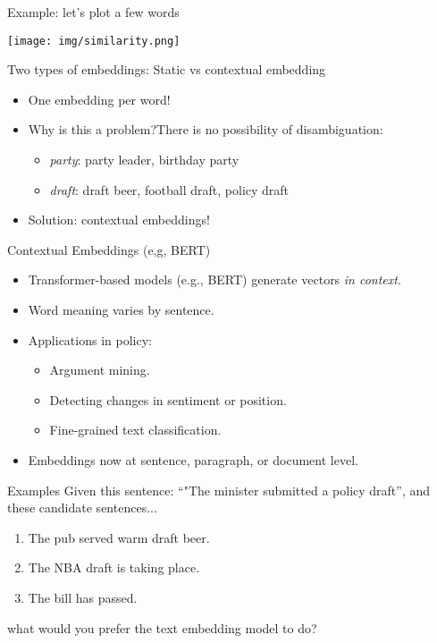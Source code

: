 \documentclass{beamer}
\begin{document}
\begin{frame}{Example: let's plot a few words}
    \begin{center}
        \texttt{[image: img/similarity.png]}
    \end{center}
\end{frame}
    
\begin{frame}{Two types of embeddings: Static vs contextual embedding}
    \begin{itemize}
        \item One embedding per word!
        \item Why is this a problem?There is no possibility of disambiguation:
        \begin{itemize}
            \item \textit{party}: party leader, birthday party
            \item \textit{draft}: draft beer, football draft, policy draft
        \end{itemize}
        \item Solution: contextual embeddings!
    \end{itemize}
\end{frame}

\begin{frame}{Contextual Embeddings (e,g, BERT)}
    \begin{itemize}
        \item Transformer-based models (e.g., BERT) generate vectors \textit{in context}.
        \item Word meaning varies by sentence.
        \item Applications in policy:
        \begin{itemize}
            \item Argument mining.
            \item Detecting changes in sentiment or position.
            \item Fine-grained text classification.
        \end{itemize}
        \item Embeddings now at sentence, paragraph, or document level.
    \end{itemize}
\end{frame}

\begin{frame}{Examples}
    Given this sentence: ``"The minister submitted a policy draft'', and these candidate sentences... 
    \vspace{0.5cm}
    \begin{enumerate}
        \item The pub served warm draft beer.
        \item The NBA draft is taking place.
        \item The bill has passed.
    \end{enumerate}
    \vspace{0.5cm}
     what would you prefer the text embedding model to do?
\end{frame}
\end{document}
